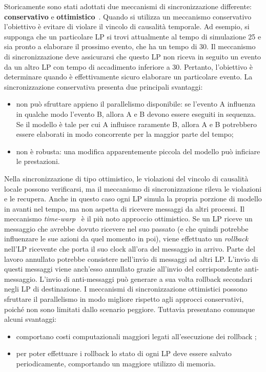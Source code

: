 \documentclass[12pt,a4paper,openright,twoside]{book}
\begin{document}
Storicamente sono stati adottati due meccanismi di sincronizzazione differente: \textbf{conservativo} e \textbf{ottimistico}~\cite{DBLP:conf/wsc/Fujimoto95}.
Quando si utilizza un meccanismo conservativo l'obiettivo è evitare di violare il vincolo di causalità temporale. Ad esempio, si supponga che un particolare LP si trovi attualmente al tempo di simulazione 25 e sia pronto a elaborare il prossimo evento, che ha un tempo di 30. Il meccanismo di sincronizzazione deve assicurarsi che questo LP non riceva in seguito un evento da un altro LP con tempo di accadimento inferiore a 30. Pertanto, l'obiettivo è determinare quando è effettivamente sicuro elaborare un particolare evento. 
La sincronizzazione conservativa presenta due principali svantaggi: 
\begin{itemize}
    \item non può sfruttare appieno il parallelismo disponibile: se l'evento A influenza in qualche modo l'evento B, allora A e B devono essere eseguiti in sequenza. Se il modello è tale per cui A influisce raramente B, allora A e B potrebbero essere elaborati in modo concorrente per la maggior parte del tempo;
    \item non è robusta: una modifica apparentemente piccola del modello può inficiare le prestazioni. 
\end{itemize}
Nella sincronizzazione di tipo ottimistico, le violazioni del vincolo di causalità locale possono verificarsi, ma il meccanismo di sincronizzazione rileva le violazioni e le recupera. Anche in questo caso ogni LP simula la propria porzione di modello in avanti nel tempo, ma non aspetta di ricevere messaggi da altri processi. 
Il meccanismo \textit{time-warp}~\cite{DBLP:journals/toplas/Jefferson85} è il più noto approccio ottimistico. Se un LP riceve un messaggio che avrebbe dovuto ricevere nel suo passato (e che quindi potrebbe influenzare le sue azioni da quel momento in poi), viene effettuato un \textit{rollback} nell'LP ricevente che porta il suo clock all'ora del messaggio in arrivo.
Parte del lavoro annullato potrebbe consistere nell'invio di messaggi ad altri LP. L'invio di questi messaggi viene anch'esso annullato grazie all'invio del corrispondente anti-messaggio. L'invio di anti-messaggi può generare a sua volta rollback secondari negli LP di destinazione.
I meccanismi di sincronizzazione ottimistici possono sfruttare il parallelismo in modo migliore rispetto agli approcci conservativi, poiché non sono limitati dallo scenario peggiore. Tuttavia presentano comunque alcuni svantaggi: 
\begin{itemize}
    \item comportano costi computazionali maggiori legati all'esecuzione dei rollback \cite{Ziganurova2019SynchronizationAO}; 
    \item per poter effettuare i rollback lo stato di ogni LP deve essere salvato periodicamente, comportando un maggiore utilizzo di memoria.
\end{itemize}
\end{document}
